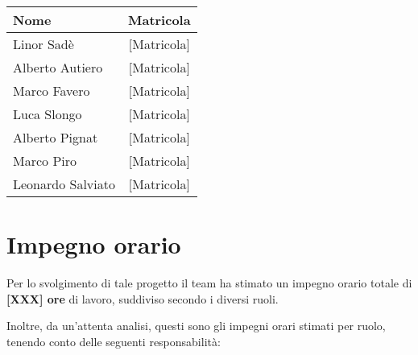 \documentclass[a4paper,12pt]{article}
\begin{document}
\begin{center}
\begin{tcolorbox}[colback=lightgray,colframe=primaryblue,width=0.85\textwidth,arc=3mm,boxrule=0.5pt,title={\bfseries Il team BugBusters}]
\begin{center}
\begin{tabular}{lc}
\toprule
\textbf{Nome} & \textbf{Matricola} \\
\midrule
Linor Sadè & {[Matricola]} \\
Alberto Autiero & {[Matricola]} \\
Marco Favero & {[Matricola]} \\
Luca Slongo & {[Matricola]} \\
Alberto Pignat & {[Matricola]} \\
Marco Piro & {[Matricola]} \\
Leonardo Salviato & {[Matricola]} \\
\bottomrule
\end{tabular}
\end{center}
\end{tcolorbox}
\end{center}

\vspace{1cm}

\renewcommand{\cftsecpagefont}{\normalfont}
\renewcommand{\cftsecleader}{\cftdotfill{\cftsecdotsep}}
\setlength{\cftbeforesecskip}{2pt}
\begin{center}
\begin{tcolorbox}[colback=lightgray,colframe=darkgray,width=0.9\textwidth,arc=2mm,boxrule=0.5pt]
\tableofcontents
\end{tcolorbox}
\end{center}

\newpage

\section{Impegno orario}

Per lo svolgimento di tale progetto il team ha stimato un impegno orario totale di \textbf{[XXX] ore} di lavoro, suddiviso secondo i diversi ruoli.

Inoltre, da un'attenta analisi, questi sono gli impegni orari stimati per ruolo, tenendo conto delle seguenti responsabilità:

\vspace{0.5cm}
\end{document}
